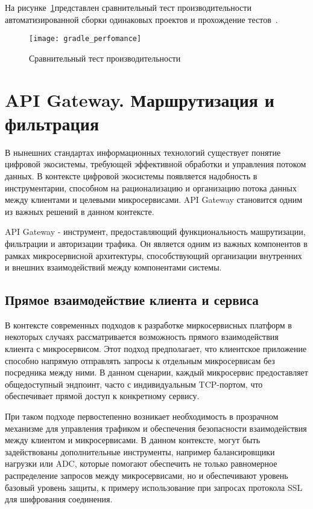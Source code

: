На рисунке~\ref{fig:performance_comparison}представлен сравнительный тест производительности автоматизированной сборки одинаковых проектов и прохождение тестов~\cite{detailed_comprasion}.

\begin{figure}[htbp]
    \centering
    \texttt{[image: gradle\_perfomance]}
    \caption{Сравнительный тест производительности}
    \label{fig:performance_comparison}
\end{figure}


\section{API Gateway. Маршрутизация и фильтрация}

В нынешних стандартах информационных технологий существует понятие цифровой экосистемы, требующей
эффективной обработки и управления потоком данных.
В контексте цифровой экосистемы появляется
надобность в инструментарии, способном на рационализацию и организацию потока данных между
клиентами и целевыми микросервисами.
API Gateway становится одним из важных решений в данном
контексте.

API Gateway - инструмент, предоставляющий функциональность машрутизации, фильтрации и авторизации
трафика.
Он является одним из важных компонентов в рамках микросервисной архитектуры,
способствующий организации внутренних и внешних взаимодействий между компонентами системы.

\subsection{Прямое взаимодействие клиента и сервиса}

В контексте современных подходов к разработке миркосервисных платформ в некоторых случаях
рассматривается возможность прямого взаимодействия клиента с микросервисом.
Этот подход
предполагает, что клиентское приложение
способно напрямую отправлять запросы к отдельным микросервисам без посредника между ними.
В данном
сценарии, каждый микросервис предоставляет общедоступный эндпоинт, часто с индивидуальным
TCP-портом, что обеспечивает прямой доступ к конкретному сервису.

При таком подходе первостепенно возникает необходимость в прозрачном механизме для управления
трафиком и обеспечения безопасности
взаимодействия между клиентом и микросервисами.
В данном контексте, могут быть задействованы
дополнительные
инструменты, например балансировщики нагрузки или ADC, которые помогают
обеспечить не только равномерное распределение запросов между микросервисами, но и обеспечивают
уровень базовый уровень защиты, к примеру использование при запросах
протокола SSL для шифрования соединения.


